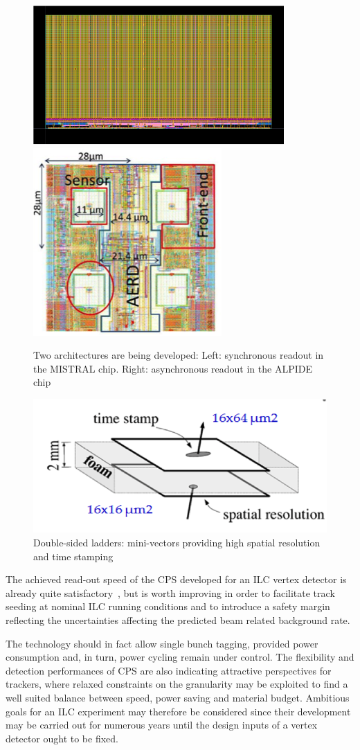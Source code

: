 \begin{figure}[hb]
	\centering
	\includegraphics[width=.45\linewidth]{VertexDetector/CMOS/Mistral}
	\includegraphics[width=.35\linewidth]{VertexDetector/CMOS/ALPIDE}
	\caption{Two architectures are being developed: Left: synchronous readout in the MISTRAL chip. Right: asynchronous readout in the ALPIDE chip}
	\label{fig:VertexDetector:CMOS:architectures}
\end{figure}
\begin{figure}
	\centering
	\includegraphics[width=.5\linewidth]{VertexDetector/CMOS/doubleSided}
	\caption{Double-sided ladders: mini-vectors providing
      high spatial resolution and time stamping}
	\label{fig:VertexDetector:CMOS:doubleSided}
\end{figure}
The achieved read-out speed of the CPS developed for an ILC
vertex detector is already quite satisfactory~\cite{Behnke:2013lya},
but is worth
improving in order to facilitate track seeding at nominal ILC
running conditions and to introduce a safety margin reflecting the
uncertainties affecting the predicted beam related background rate.

The technology should in fact allow single bunch tagging, provided power
consumption and, in turn, power cycling remain under control. The flexibility and detection performances of CPS are also indicating attractive perspectives for trackers, where relaxed constraints on the granularity may be exploited
to find a well suited balance between speed, power saving and material budget. Ambitious goals for an ILC experiment may therefore be considered
since their development may be carried out for numerous years until the design
inputs of a vertex detector ought to be fixed.

